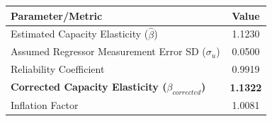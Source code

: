 \begin{tabular}{lc}
\hline
\textbf{Parameter/Metric} & \textbf{Value} \\
\hline
Estimated Capacity Elasticity ($\hat{\beta}$) & 1.1230 \\
Assumed Regressor Measurement Error SD ($\sigma_u$) & 0.0500 \\
Reliability Coefficient & 0.9919 \\
\textbf{Corrected Capacity Elasticity ($\beta_{corrected}$)} & \textbf{1.1322} \\
Inflation Factor & 1.0081 \\
\hline
\end{tabular}
